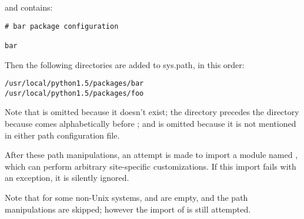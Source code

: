 and  contains:

\bcode\begin{verbatim}
# bar package configuration

bar
\end{verbatim}\ecode

Then the following directories are added to sys.path, in this order:

\bcode\begin{verbatim}
/usr/local/python1.5/packages/bar
/usr/local/python1.5/packages/foo
\end{verbatim}\ecode

Note that  is omitted because it doesn't exist; the
 directory precedes the  directory because
 comes alphabetically before ; and
 is omitted because it is not mentioned in either path
configuration file.

After these path manipulations, an attempt is made to import a module
named , which can perform arbitrary site-specific
customizations.  If this import fails with an 
exception, it is silently ignored.

Note that for some non-Unix systems,  and
 are empty, and the path manipulations are
skipped; however the import of  is still attempted.
